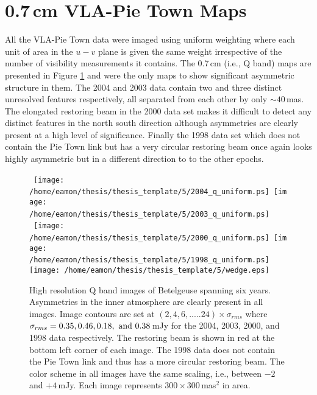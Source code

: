 \section{0.7\,cm VLA-Pie Town Maps}\label{sec:5.15}

All the VLA-Pie Town data were imaged using uniform weighting where each unit of area in the $u-v$ plane is given the same weight irrespective of the number of visibility measurements it contains. The 0.7\,cm (i.e., Q band) maps are presented in Figure \ref{fig:5.17} and were the only maps to show significant asymmetric structure in them. The 2004 and 2003 data contain two and three distinct unresolved features respectively, all separated from each other by only $\sim 40$\,mas. The elongated restoring beam in the 2000 data set makes it difficult to detect any distinct features in the north south direction although asymmetries are clearly present at a high level of significance. Finally the 1998 data set which does not contain the Pie Town link but has a very circular restoring beam once again looks highly asymmetric but in a different direction to to the other epochs.

\begin{figure}[p]
\mbox{
          \texttt{[image: /home/eamon/thesis/thesis\_template/5/2004\_q\_uniform.ps]}
          \texttt{[image: /home/eamon/thesis/thesis\_template/5/2003\_q\_uniform.ps]}
          }
\\
\mbox{
          \texttt{[image: /home/eamon/thesis/thesis\_template/5/2000\_q\_uniform.ps]}
          \texttt{[image: /home/eamon/thesis/thesis\_template/5/1998\_q\_uniform.ps]}
          }
\\
          \texttt{[image: /home/eamon/thesis/thesis\_template/5/wedge.eps]}         
\caption[Pie Town Q band images spanning six years]{High resolution Q band images of Betelgeuse spanning six years. Asymmetries in the inner atmosphere are clearly present in all images. Image contours are set at $(2,4,6,.....24)\times \sigma_{rms}$ where $\sigma_{rms}=0.35, 0.46,0.18, \ \rm{and} \  0.38$\,mJy for the 2004, 2003, 2000, and 1998 data respectively. The restoring beam is shown in red at the bottom left corner of each image. The 1998 data does not contain the Pie Town link and thus has a more circular restoring beam. The color scheme in all images have the same scaling, i.e., between $-2$ and $+4$\,mJy. Each image represents $300\times 300$\,mas$^2$ in area.}
\label{fig:5.17}
\end{figure}

